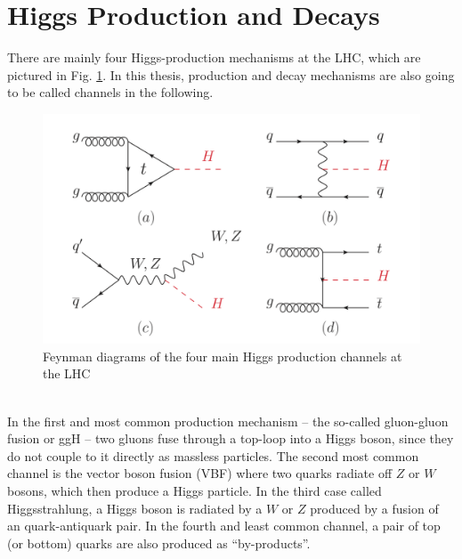 \section{Higgs Production and Decays}
There are mainly four Higgs-production mechanisms at the LHC, which are pictured in Fig. \ref{fig:Higgs_productions}. In this thesis, production and decay mechanisms are also going to be called channels in the following.

\begin{figure}[h]
	\centering
	\includegraphics[width=0.7\linewidth]{Figures/Higgs-production_PDG_Huge_p183}
	\caption{Feynman diagrams of the four main Higgs production channels at the LHC \parencite{PDG_source}}
	\label{fig:Higgs_productions}
\end{figure}\\
In the first and most common production mechanism -- the so-called gluon-gluon fusion or ggH -- two gluons fuse through a top-loop into a Higgs boson, since they do not couple to it directly as massless particles. The second most common channel is the vector boson fusion (VBF) where two quarks radiate off $Z$ or $W$ bosons, which then produce a Higgs particle. In the third case called Higgsstrahlung, a Higgs boson is radiated by a $W$ or $Z$ produced by a fusion of an quark-antiquark pair. In the fourth and least common channel, a pair of top (or bottom) quarks are also produced as ``by-products''. \\

